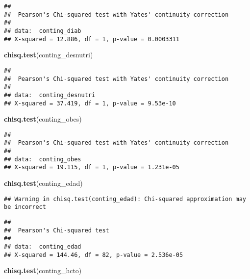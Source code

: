 \documentclass[]{article}
\newenvironment{Shaded}{\begin{snugshade}}{\end{snugshade}}
\newcommand{\KeywordTok}[1]{\textcolor[rgb]{0.13,0.29,0.53}{\textbf{#1}}}
\newcommand{\NormalTok}[1]{#1}
\begin{document}
\begin{verbatim}
## 
##  Pearson's Chi-squared test with Yates' continuity correction
## 
## data:  conting_diab
## X-squared = 12.886, df = 1, p-value = 0.0003311
\end{verbatim}

\begin{Shaded}
\begin{Highlighting}[]
\KeywordTok{chisq.test}\NormalTok{(conting_desnutri)}
\end{Highlighting}
\end{Shaded}

\begin{verbatim}
## 
##  Pearson's Chi-squared test with Yates' continuity correction
## 
## data:  conting_desnutri
## X-squared = 37.419, df = 1, p-value = 9.53e-10
\end{verbatim}

\begin{Shaded}
\begin{Highlighting}[]
\KeywordTok{chisq.test}\NormalTok{(conting_obes)}
\end{Highlighting}
\end{Shaded}

\begin{verbatim}
## 
##  Pearson's Chi-squared test with Yates' continuity correction
## 
## data:  conting_obes
## X-squared = 19.115, df = 1, p-value = 1.231e-05
\end{verbatim}

\begin{Shaded}
\begin{Highlighting}[]
\KeywordTok{chisq.test}\NormalTok{(conting_edad)}
\end{Highlighting}
\end{Shaded}

\begin{verbatim}
## Warning in chisq.test(conting_edad): Chi-squared approximation may be incorrect
\end{verbatim}

\begin{verbatim}
## 
##  Pearson's Chi-squared test
## 
## data:  conting_edad
## X-squared = 144.46, df = 82, p-value = 2.536e-05
\end{verbatim}

\begin{Shaded}
\begin{Highlighting}[]
\KeywordTok{chisq.test}\NormalTok{(conting_hcto)}
\end{Highlighting}
\end{Shaded}
\end{document}

